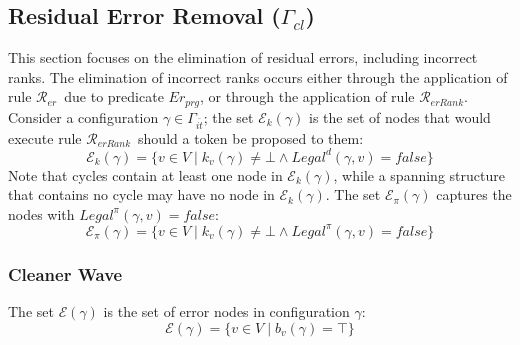 \documentclass[a4paper, 12pt]{article}
\newcommand{\rk}{k}
\newcommand{\Rer}{$\mathscr{R}_{er}$}
\newcommand{\RerRank}{$\mathscr{R}_{erRank}$}
\begin{document}
\subsection{Residual Error Removal ($\Gamma_{cl}$)}
\label{subsec:residual}

This section focuses on the elimination of residual errors, including 
incorrect ranks. The elimination of incorrect ranks occurs either through 
the application of rule \Rer\ due to predicate $Er_{prg}$, or through 
the application of rule \RerRank. Consider a configuration 
$\gamma \in \Gamma_{\bar{it}}$; the set $\mathcal{E}_k(\gamma)$ is the set of 
nodes that would execute rule \RerRank\ should a token be proposed to 
them:
\begin{equation}
    \mathcal{E}_k(\gamma) = \{v \in V \mid \rk_v(\gamma) \neq \bot 
    \wedge Legal^d(\gamma,v) = \mathit{false}\}
\end{equation}
Note that cycles contain at least one node in $\mathcal{E}_k(\gamma)$, 
while a spanning structure that contains no cycle may have no node in 
$\mathcal{E}_k(\gamma)$. The set $\mathcal{E}_\pi(\gamma)$ captures the 
nodes with $Legal^\pi(\gamma,v) = \mathit{false}$:
\begin{equation}
    \mathcal{E}_\pi(\gamma) = \{v \in V \mid \rk_v(\gamma) \neq \bot 
    \wedge Legal^\pi(\gamma,v) = \mathit{false}\}
\end{equation}

\subsubsection{Cleaner Wave}
\label{subsub:clean}

The set $\mathcal{E}(\gamma)$ is the set of error nodes in configuration 
$\gamma$:
\begin{equation}
    \mathcal{E}(\gamma) = \{v \in V \mid b_v(\gamma) = \top\}
\end{equation}
\end{document}
